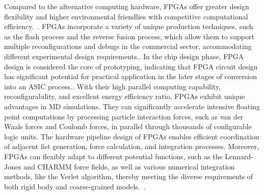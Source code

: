\documentclass{article}
\begin{document}
\noindent
Compared to the alternative computing hardware, FPGAs offer greater design 
flexibility and higher environmental friendlies with competitive computational 
efficiency.~\cite{ref3,10.5555/1296098,7550743,9444063}. 
FPGAs incorporate a variety of unique production techniques, such as the flash 
process and the reverse fusion process, which allow them to support multiple 
reconfigurations and debugs in the commercial sector, accommodating different 
experimental design requirements.\cite{ref22}. 
In the chip design phase, FPGA design is considered the core of prototyping, 
indicating that FPGA circuit design has significant potential for practical 
application in the later stages of conversion into an ASIC process.\cite{ref18,410733}. 
With their high parallel computing capability, reconfigurability, and 
excellent energy efficiency ratio, FPGAs exhibit unique advantages in MD simulations. 
They can significantly accelerate intensive floating point computations by 
processing particle interaction forces, such as van der Waals forces and 
Coulomb forces, in parallel through thousands of configurable logic units. 
The hardware pipeline design of FPGAs enables efficient coordination of 
adjacent list generation, force calculation, and integration processes. 
Moreover, FPGAs can flexibly adapt to different potential functions, such as 
the Lennard-Jones and CHARMM force fields, as well as various numerical 
integration methods, like the Verlet algorithm, thereby meeting the diverse 
requirements of both rigid body and coarse-grained 
models.~\cite{2019arXiv190505359Y}.\\
\end{document}

